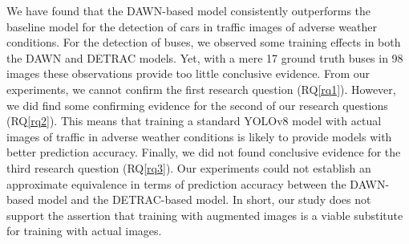 \documentclass[]{article}
\begin{document}
We have found that the DAWN-based model consistently outperforms the baseline model for the detection of cars in traffic images of adverse weather conditions. For the detection of buses, we observed some training effects in both the DAWN and DETRAC models. Yet, with a mere 17 ground truth buses in 98 images these observations provide too little conclusive evidence. From our experiments, we cannot confirm the first research question (RQ\ref{rq1}). However, we did find some confirming evidence for the second of our research questions (RQ\ref{rq2}). This means that training a standard YOLO\small{v8} model with actual images of traffic in adverse weather conditions is likely to provide models with better prediction accuracy. Finally, we did not found conclusive evidence for the third research question (RQ\ref{rq3}). Our experiments could not establish an approximate equivalence in terms of prediction accuracy between the DAWN-based model and the DETRAC-based model. In short, our study does not support the assertion that training with augmented images is a viable substitute for training with actual images. 
\end{document}
